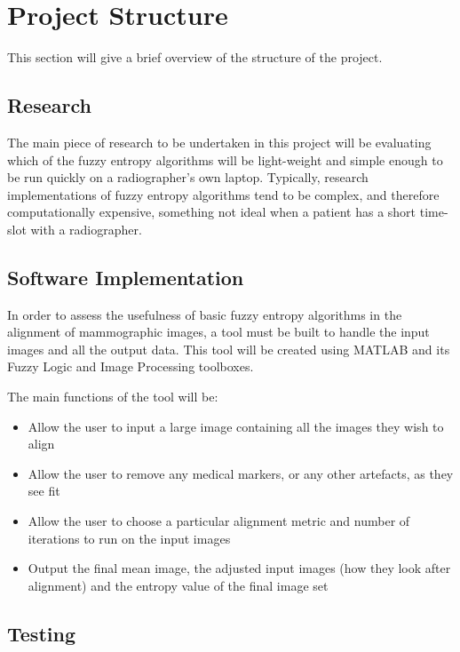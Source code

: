 \section{Project Structure}

This section will give a brief overview of the structure of the project.

\subsection{Research}

The main piece of research to be undertaken in this project will be evaluating which of the fuzzy entropy algorithms will be light-weight and simple enough to be run quickly on a radiographer's own laptop. Typically, research implementations of fuzzy entropy algorithms tend to be complex, and therefore computationally expensive, something not ideal when a patient has a short time-slot with a radiographer.

\subsection{Software Implementation}

In order to assess the usefulness of basic fuzzy entropy algorithms in the alignment of mammographic images, a tool must be built to handle the input images and all the output data. This tool will be created using MATLAB \cite{MATLAB:2016} and its Fuzzy Logic \cite{fuzzy_toolbox} and Image Processing \cite{image_toolbox} toolboxes.

The main functions of the tool will be:

\begin{itemize}
  \item Allow the user to input a large image containing all the images they wish to align
  \item Allow the user to remove any medical markers, or any other artefacts, as they see fit
  \item Allow the user to choose a particular alignment metric and number of iterations to run on the input images
  \item Output the final mean image, the adjusted input images (how they look after alignment) and the entropy value of the final image set
\end{itemize}

\subsection{Testing}


